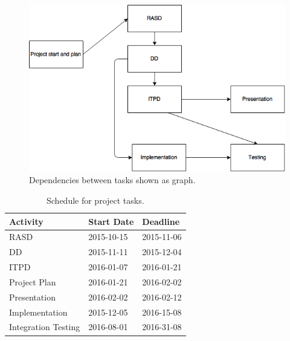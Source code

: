 \begin{figure}
    \centering
    \includegraphics[width=\textwidth]{img/tasks-dep-graph.jpg}
    \caption{Dependencies between tasks shown as graph.}
    \label{fig:tasks-dep-graph}
\end{figure}

\begin{table}[p]
    \centering
    \begin{tabular}{| l | l | l |}
        \hline
        \textbf{Activity}   & \textbf{Start Date}   & \textbf{Deadline} \\
        \hline
        RASD                & 2015-10-15            & 2015-11-06        \\
        DD                  & 2015-11-11            & 2015-12-04        \\
        ITPD                & 2016-01-07            & 2016-01-21        \\
        Project Plan        & 2016-01-21            & 2016-02-02        \\
        Presentation        & 2016-02-02            & 2016-02-12        \\
        Implementation      & 2015-12-05            & 2016-15-08        \\
        Integration Testing & 2016-08-01            & 2016-31-08        \\
        \hline
    \end{tabular}
    \caption{Schedule for project tasks.}
    \label{tab:schedule}
\end{table}

